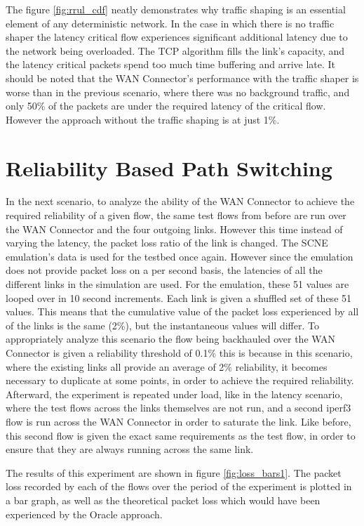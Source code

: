 The figure \ref{fig:rrul_cdf} neatly demonstrates why traffic shaping is an essential element of any deterministic network. In the case in which there is no traffic shaper the latency critical flow experiences significant additional latency due to the network being overloaded. The TCP algorithm fills the link's capacity, and the latency critical packets spend too much time buffering and arrive late. It should be noted that the WAN Connector's performance with the traffic shaper is worse than in the previous scenario, where there was no background traffic, and only 50\% of the packets are under the required latency of the critical flow. However the approach without the traffic shaping is at just 1\%.

\section{Reliability Based Path Switching}

In the next scenario, to analyze the ability of the WAN Connector to achieve the required reliability of a given flow, the same test flows from before are run over the WAN Connector and the four outgoing links. However this time instead of varying the latency, the packet loss ratio of the link is changed. The SCNE emulation's data is used for the testbed once again. However since the emulation does not provide packet loss on a per second basis, the latencies of all the different links in the simulation are used. For the emulation, these 51 values are looped over in 10 second increments. Each link is given a shuffled set of these 51 values. This means that the cumulative value of the packet loss experienced by all of the links is the same (2\%), but the instantaneous values will differ. To appropriately analyze this scenario the flow being backhauled over the WAN Connector is given a reliability threshold of 0.1\% this is because in this scenario, where the existing links all provide an average of 2\% reliability, it becomes necessary to duplicate at some points, in order to achieve the required reliability. Afterward, the experiment is repeated under load, like in the latency scenario, where the test flows across the links themselves are not run, and a second iperf3 flow is run across the WAN Connector in order to saturate the link. Like before, this second flow is given the exact same requirements as the test flow, in order to ensure that they are always running across the same link.

 The results of this experiment are shown in figure \ref{fig:loss_bars1}. The packet loss recorded by each of the flows over the period of the experiment is plotted in a bar graph, as well as the theoretical packet loss which would have been experienced by the Oracle approach.

